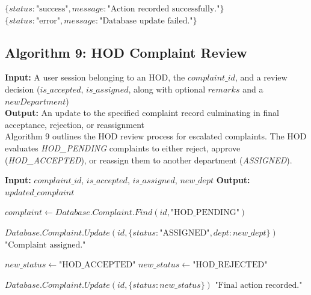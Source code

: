 \begin{algorithm}[htbp]
\begin{algorithmic}[1]
        \State \Return $\{status: \text{"success"}, message: \text{"Action recorded successfully."}\}$
    \Else
        \State \Return $\{status: \text{"error"}, message: \text{"Database update failed."}\}$
    \EndIf

\EndFunction

\end{algorithmic}
\end{algorithm}


\subsection{Algorithm 9: HOD Complaint Review}

\textbf{Input:} A user session belonging to an HOD, the $complaint\_id$, and a review decision ($is\_accepted$, $is\_assigned$, along with optional $remarks$ and a $newDepartment$) \\
\textbf{Output:} An update to the specified complaint record culminating in final acceptance, rejection, or reassignment \\

Algorithm 9 outlines the HOD review process for escalated complaints. The HOD evaluates \textit{HOD\_PENDING} complaints to either reject, approve (\textit{HOD\_ACCEPTED}), or reassign them to another department (\textit{ASSIGNED}).

\begin{algorithm}[H]
\caption{HOD Decision Workflow}
\begin{algorithmic}[1]

\State \textbf{Input:} $complaint\_id$, $is\_accepted$, $is\_assigned$, $new\_dept$
\State \textbf{Output:} $updated\_complaint$


    \State {}
    \State $complaint \gets Database.Complaint.Find(id, \text{"HOD\_PENDING"})$

        \State {}
        \State $Database.Complaint.Update(id, \{status: \text{"ASSIGNED"}, dept: new\_dept\})$
        \State \Return $\text{"Complaint assigned."}$
    \EndIf

    \State {}
        \State $new\_status \gets \text{"HOD\_ACCEPTED"}$
    \Else
        \State $new\_status \gets \text{"HOD\_REJECTED"}$
    \EndIf

    \State {}
    \State $Database.Complaint.Update(id, \{status: new\_status\})$
    \State \Return $\text{"Final action recorded."}$

\EndFunction

\end{algorithmic}
\end{algorithm}

